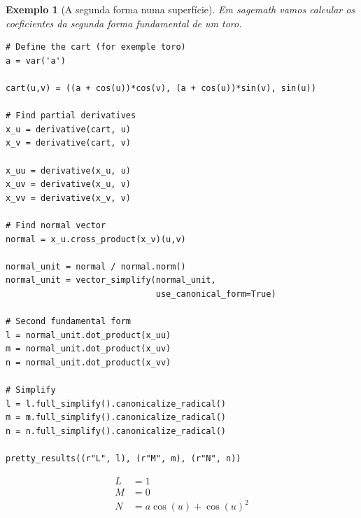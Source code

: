 \documentclass[12pt]{article}
\newtheorem{ex}{Exemplo}[section]
\begin{document}
\begin{ex}[A segunda forma numa superfície]
Em \textit{sagemath} vamos calcular os coeficientes da segunda forma fundamental de um toro.

\begin{lstlisting}
# Define the cart (for exemple toro)
a = var('a')

cart(u,v) = ((a + cos(u))*cos(v), (a + cos(u))*sin(v), sin(u))

# Find partial derivatives
x_u = derivative(cart, u)
x_v = derivative(cart, v)

x_uu = derivative(x_u, u)
x_uv = derivative(x_u, v)
x_vv = derivative(x_v, v)

# Find normal vector
normal = x_u.cross_product(x_v)(u,v)
    
normal_unit = normal / normal.norm()
normal_unit = vector_simplify(normal_unit, 
                              use_canonical_form=True)

# Second fundamental form
l = normal_unit.dot_product(x_uu)
m = normal_unit.dot_product(x_uv)
n = normal_unit.dot_product(x_vv)

# Simplify
l = l.full_simplify().canonicalize_radical()
m = m.full_simplify().canonicalize_radical()
n = n.full_simplify().canonicalize_radical()

pretty_results((r"L", l), (r"M", m), (r"N", n))
\end{lstlisting}

\begin{align*} L &= 1 \\ M &= 0 \\ N &= a \cos\left(u\right) + \cos\left(u\right)^{2} \\ \end{align*} \\
\end{ex}



\end{document}
